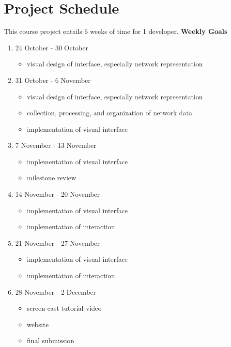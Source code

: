 \section{Project Schedule}

This course project entails 6 weeks of time for 1 developer.
\newline
\newline
\noindent
\textbf{Weekly Goals}
\begin{enumerate}
\item 24 October - 30 October
\begin{itemize}
\item visual design of interface, especially network representation
\end{itemize}
\item 31 October - 6 November
\begin{itemize}
\item visual design of interface, especially network representation
\item collection, processing, and organization of network data
\item implementation of visual interface
\end{itemize}
\item 7 November - 13 November
\begin{itemize}
\item implementation of visual interface
\item milestone review
\end{itemize}
\item 14 November - 20 November
\begin{itemize}
\item implementation of visual interface
\item implementation of interaction
\end{itemize}
\item 21 November - 27 November
\begin{itemize}
\item implementation of visual interface
\item implementation of interaction
\end{itemize}
\item 28 November - 2 December
\begin{itemize}
\item screen-cast tutorial video
\item website
\item final submission
\end{itemize}
\end{enumerate}